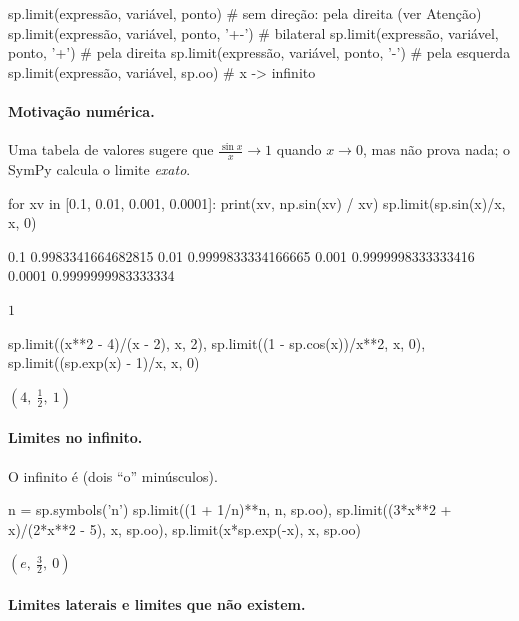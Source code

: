 \begin{sintaxe}
sp.limit(expressão, variável, ponto)          # sem direção: pela direita (ver Atenção)
sp.limit(expressão, variável, ponto, '+-')    # bilateral
sp.limit(expressão, variável, ponto, '+')     # pela direita
sp.limit(expressão, variável, ponto, '-')     # pela esquerda
sp.limit(expressão, variável, sp.oo)          # x -> infinito
\end{sintaxe}

\paragraph{Motivação numérica.} Uma tabela de valores sugere que $\frac{\sin x}{x}\to1$ quando $x\to0$, mas não
prova nada; o SymPy calcula o limite \emph{exato}.

\begin{entrada}
for xv in [0.1, 0.01, 0.001, 0.0001]:
    print(xv, np.sin(xv) / xv)
sp.limit(sp.sin(x)/x, x, 0)
\end{entrada}
\begin{saida}
0.1 0.9983341664682815
0.01 0.9999833334166665
0.001 0.9999998333333416
0.0001 0.9999999983333334
\end{saida}
\begin{saidamat}
$\displaystyle 1$
\end{saidamat}

\begin{entrada}
sp.limit((x**2 - 4)/(x - 2), x, 2), sp.limit((1 - sp.cos(x))/x**2, x, 0), sp.limit((sp.exp(x) - 1)/x, x, 0)
\end{entrada}
\begin{saidamat}
$\displaystyle \left( 4, \  \frac{1}{2}, \  1\right)$
\end{saidamat}

\paragraph{Limites no infinito.} O infinito é  (dois ``o'' minúsculos).

\begin{entrada}
n = sp.symbols('n')
sp.limit((1 + 1/n)**n, n, sp.oo), sp.limit((3*x**2 + x)/(2*x**2 - 5), x, sp.oo), sp.limit(x*sp.exp(-x), x, sp.oo)
\end{entrada}
\begin{saidamat}
$\displaystyle \left( e, \  \frac{3}{2}, \  0\right)$
\end{saidamat}

\paragraph{Limites laterais e limites que não existem.}

